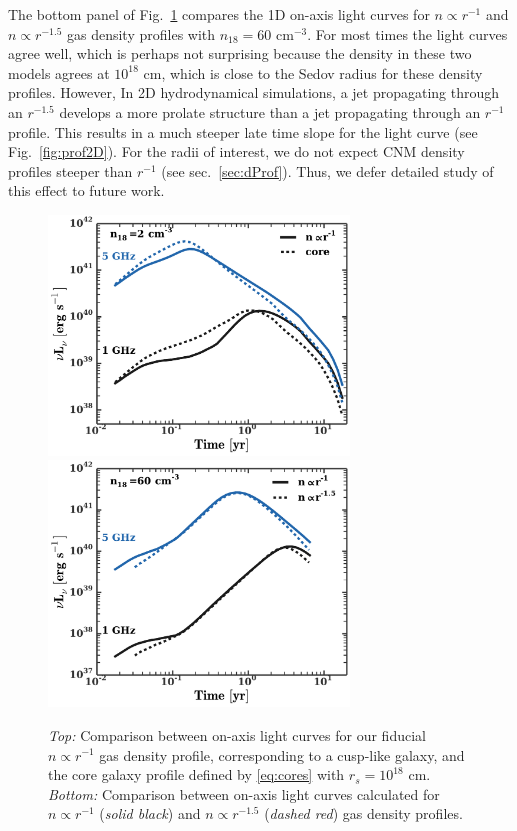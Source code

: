 \documentclass[usenatbib,fleqn]{mnras}
\begin{document}
The bottom panel of Fig.~\ref{fig:cores} compares the 1D on-axis light
curves for $n\propto r^{-1}$ and $n\propto r^{-1.5}$ gas density
profiles with $n_{18}=60$ cm$^{-3}$. For most times the light curves
agree well, which is perhaps not surprising because the density in
these two models agrees at $10^{18}$ cm, which is close to the Sedov
radius for these density profiles. However, In 2D hydrodynamical
simulations, a jet propagating through an $r^{-1.5}$ develops a more
prolate structure than a jet propagating through an $r^{-1}$
profile. This results in a much steeper late time slope for the light
curve (see Fig.~\ref{fig:prof2D}).  For the radii of interest, we do
not expect CNM density profiles steeper than $r^{-1}$ (see
sec.~\ref{sec:dProf}). Thus, we defer detailed study of this effect to
future work.


\begin{figure} 
  \includegraphics[width=8cm]{fig_cores.pdf}
  \includegraphics[width=8cm]{prof.pdf}
  \caption{\label{fig:cores} {\it Top:} Comparison between on-axis
    light curves for our fiducial $n\propto r^{-1}$ gas density
    profile, corresponding to a cusp-like galaxy, and the core galaxy
    profile defined by \eqref{eq:cores} with $r_s=10^{18}$ cm. {\it
      Bottom:} Comparison between on-axis light curves calculated for
    $n\propto r^{-1}$ ({\it solid black}) and $n\propto r^{-1.5}$
    ({\it dashed red}) gas density profiles.}
\end{figure}
\end{document}

